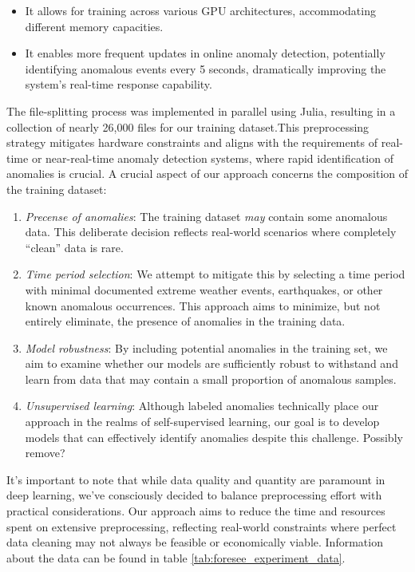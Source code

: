 \begin{itemize}
    \item It allows for training across various GPU architectures, accommodating different memory capacities.
    \item It enables more frequent updates in online anomaly detection, potentially identifying anomalous events every 5 seconds, dramatically improving the system's real-time response capability.
\end{itemize}


The file-splitting process was implemented in parallel using Julia, resulting in a collection of nearly 26,000 files for our training dataset.This preprocessing strategy mitigates hardware constraints and aligns with the requirements of real-time or near-real-time anomaly detection systems, where rapid identification of anomalies is crucial. A crucial aspect of our approach concerns the composition of the training dataset:

\begin{enumerate}
    \item \textit{Precense of anomalies}: The training dataset \textit{may} contain some anomalous data. This deliberate decision reflects real-world scenarios where completely ``clean'' data is rare.
    \item \textit{Time period selection}: We attempt to mitigate this by selecting a time period with minimal documented extreme weather events, earthquakes, or other known anomalous occurrences. This approach aims to minimize, but not entirely eliminate, the presence of anomalies in the training data.
    \item \textit{Model robustness}: By including potential anomalies in the training set, we aim to examine whether our models are sufficiently robust to withstand and learn from data that may contain a small proportion of anomalous samples.
    \item \textit{Unsupervised learning}: Although labeled anomalies technically place our approach in the realms of self-supervised learning, our goal is to develop models that can effectively identify anomalies despite this challenge. Possibly remove?
\end{enumerate}

It's important to note that while data quality and quantity are paramount in deep learning, we've consciously decided to balance preprocessing effort with practical considerations. Our approach aims to reduce the time and resources spent on extensive preprocessing, reflecting real-world constraints where perfect data cleaning may not always be feasible or economically viable. Information about the data can be found in table \ref{tab:foresee_experiment_data}. \\


